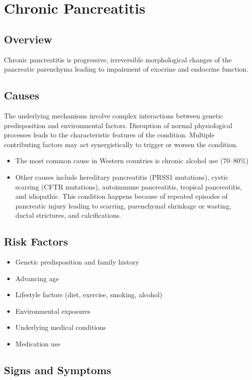 \chapter{Chronic Pancreatitis}
\label{sec:Chronic Pancreatitis}

\section{Overview}
Chronic pancreatitis is progressive, irreversible morphological changes of the pancreatic parenchyma leading to impairment of exocrine and endocrine function.
\section{Causes}
The underlying mechanisms involve complex interactions between genetic predisposition and environmental factors. Disruption of normal physiological processes leads to the characteristic features of the condition. Multiple contributing factors may act synergistically to trigger or worsen the condition.

\begin{itemize}[noitemsep]
  \item The most common cause in Western countries is chronic alcohol use (70--80\%)
  \item Other causes include hereditary pancreatitis (PRSS1 mutations), cystic scarring (CFTR mutations), autoimmune pancreatitis, tropical pancreatitis, and idiopathic. This condition happens because of repeated episodes of pancreatic injury leading to scarring, parenchymal shrinkage or wasting, ductal strictures, and calcifications.
\end{itemize}
\section{Risk Factors}


\begin{itemize}[noitemsep]
  \item Genetic predisposition and family history
  \item Advancing age
  \item Lifestyle factors (diet, exercise, smoking, alcohol)
  \item Environmental exposures
  \item Underlying medical conditions
  \item Medication use
\end{itemize}
\section{Signs and Symptoms}

